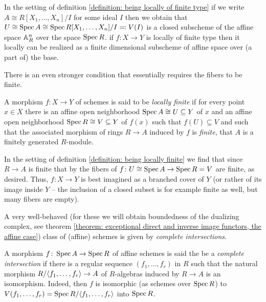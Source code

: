 \begin{remark}
	In the setting of definition \ref{definition: being locally of finite type} if we write $A \cong R[X_1,\dots, X_n]/I$ for some ideal $I$ then we obtain that $U\cong \operatorname{Spec} A \cong \operatorname{Spec} R[X_1,\dots, X_n]/I \eqqcolon V(I)$ is a closed subscheme of the affine space ${\mathbb{A}}_R^n$ over the space $\operatorname{Spec} R$. \Ie if $f\colon X\to Y$ is locally of finite type then it locally can be realized as a finite dimensional subscheme of affine space over (a part of) the base.
\end{remark}

There is an even stronger condition that essentially requires the fibers to be finite.
\begin{definition}
	\label{definition: being locally finite}
	
	A morphism $f\colon X\to Y$ of schemes is said to be \emph{locally finite} if for every point $x\in X$ there is an affine open neighborhood $\operatorname{Spec} A\cong U\subseteq Y$ of $x$ and an affine open neighborhood $\operatorname{Spec} R\cong V\subseteq Y$ of $f(x)$ such that $f(U)\subseteq V$ and such that the associated morphism of rings $R\to A$ induced by $f$ is \emph{finite}, \ie that $A$ is a finitely generated $R$-module.
\end{definition}

\begin{remark}
	In the setting of definition \ref{definition: being locally finite} we find that since $R\to A$ is finite that by \cite[\href{https://stacks.math.columbia.edu/tag/05DR}{Tag 05DR}]{stacks-project} the fibers of $f\colon U\cong \operatorname{Spec} A\to \operatorname{Spec} R=V$ are finite, as desired. Thus, $f\colon X\to Y$ is best imagined as a branched cover of $Y$ (or rather of its image inside $Y$ -- the inclusion of a closed subset is for example finite as well, but many fibers are empty).
\end{remark}

A very well-behaved (for these we will obtain boundedness of the dualizing complex, see theorem \ref{theorem: exceptional direct and inverse image functors, the affine case}) class of (affine) schemes is given by \emph{complete intersections}.
\begin{definition}
	A morphism $f\colon \operatorname{Spec} A\to \operatorname{Spec} R$ of affine schemes is said the be a \emph{complete intersection} if there is a regular sequence $(f_1,\dots,f_r)$ in $R$ such that the natural morphism $R/{\langle f_1,\dots, f_r\rangle}\to A$ of $R$-algebras induced by $R\to A$ is an isomorphism. Indeed, then $f$ is isomorphic (as schemes over $\operatorname{Spec} R$) to $V(f_1,\dots, f_r) = \operatorname{Spec} R/{\langle f_1,\dots, f_r\rangle}$ into $\operatorname{Spec} R$.
\end{definition}


